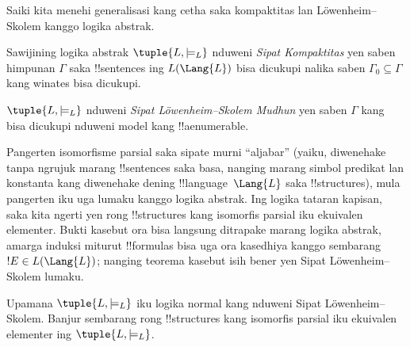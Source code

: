 \documentclass[../../../include/open-logic-section]{subfiles}
\begin{document}


Saiki kita menehi generalisasi kang cetha saka kompaktitas lan
L\"owenheim--Skolem kanggo logika abstrak.

\begin{defn}
Sawijining logika abstrak $\tuple{L, \models_L}$ nduweni
\emph{Sipat Kompaktitas} yen saben himpunan $\Gamma$ saka
!!{sentence}s ing $L(\Lang{L})$ bisa dicukupi nalika saben
$\Gamma_0 \subseteq \Gamma$ kang winates bisa dicukupi.
\end{defn}

\begin{defn}
$\tuple{L, \models_L}$ nduweni \emph{Sipat L\"owenheim--Skolem
  Mudhun} yen saben $\Gamma$ kang bisa dicukupi nduweni model
kang !!a{enumerable}.
\end{defn}


Pangerten isomorfisme parsial saka
 sipate murni “aljabar” (yaiku,
diwenehake tanpa ngrujuk marang !!{sentence}s saka basa, nanging
marang simbol predikat lan konstanta kang diwenehake dening
!!{language}~$\Lang{L}$ saka !!{structure}s), mula pangerten iku
uga lumaku kanggo logika abstrak. Ing logika tataran kapisan, saka
 kita ngerti yen rong !!{structure}s
kang isomorfis parsial iku ekuivalen elementer. Bukti kasebut ora
bisa langsung ditrapake marang logika abstrak, amarga induksi
miturut !!{formula}s bisa uga ora kasedhiya kanggo sembarang
$!E \in L(\Lang{L})$; nanging teorema kasebut isih bener yen
Sipat L\"owenheim--Skolem lumaku.

\begin{thm}
Upamana $\tuple{L, \models_L}$ iku logika normal kang nduweni
Sipat L\"owenheim--Skolem. Banjur sembarang rong !!{structure}s
kang isomorfis parsial iku ekuivalen elementer ing
$\tuple{L, \models_L}$.
\end{thm}
\end{document}
